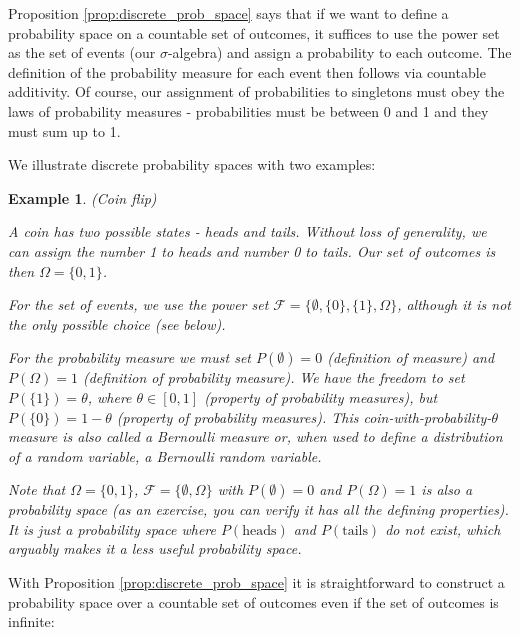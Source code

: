 \documentclass{book}
\theoremstyle{plain}%
\newtheorem{prototheorem}{Example}[section]
\newenvironment{cexample}
   {\colorlet{shadecolor}{gray!10}\begin{shaded}\begin{prototheorem}}
   {\end{prototheorem}\end{shaded}}
\theoremstyle{definition}
\begin{document}
Proposition \ref{prop:discrete_prob_space} says that if we want to define a probability space on a countable set of outcomes, it suffices to use the power set as the set of events (our $\sigma$-algebra) and assign a probability to each outcome. The definition of the probability measure for each event then follows via countable additivity. Of course, our assignment of probabilities to singletons must obey the laws of probability measures - probabilities must be between 0 and 1 and they must sum up to 1.

We illustrate discrete probability spaces with two examples:

\begin{cexample}{(Coin flip)}{}

A coin has two possible states - heads and tails. Without loss of generality, we can assign the number 1 to heads and number 0 to tails. Our set of outcomes is then $\Omega = \{0, 1\}$.

For the set of events, we use the power set $\mathcal{F} = \{\emptyset, \{0\}, \{1\}, \Omega\}$, although it is not the only possible choice (see below).

For the probability measure we must set $P(\emptyset) = 0$ (definition of measure) and $P(\Omega) = 1$ (definition of probability measure). We have the freedom to set $P(\{1\})= \theta$, where $\theta \in [0,1]$ (property of probability measures), but $P(\{0\}) = 1 - \theta$ (property of probability measures). This \emph{coin-with-probability-$\theta$} measure is also called a Bernoulli measure or, when used to define a distribution of a random variable, a Bernoulli random variable.

Note that $\Omega = \{0, 1\}$, $\mathcal{F} = \{\emptyset, \Omega\}$ with $P(\emptyset) = 0$ and $P(\Omega) = 1$ is also a probability space (as an exercise, you can verify it has all the defining properties). It is just a probability space where $P(\text{heads})$ and $P(\text{tails})$ do not exist, which arguably makes it a less useful probability space.
\end{cexample}

With Proposition \ref{prop:discrete_prob_space} it is straightforward to construct a probability space over a countable set of outcomes even if the set of outcomes is infinite:
\end{document}

